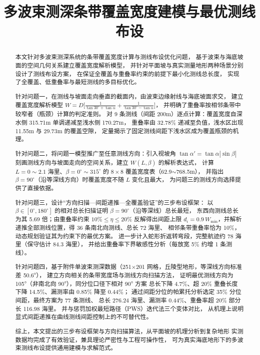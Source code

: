 \documentclass[withoutpreface,bwprint]{cumcmthesis} %
\title{多波束测深条带覆盖宽度建模与最优测线布设}
\begin{document}
\maketitle
\begin{abstract}
本文针对多波束测深系统的条带覆盖宽度计算与测线布设优化问题，
基于波束与海底坡面的空间几何关系建立覆盖宽度解析模型，
并针对平面坡与真实测量地形两种场景分别设计了测线布设方案，
在保证全覆盖与重叠率约束的前提下最小化测线总长度，
实现了全覆盖、低重叠率与最短测线的多目标优化。

针对问题一，在测线与坡面走向垂直的截面内，由波束边缘射线与海底坡面求交，
建立覆盖宽度解析模型 $W = D\big[\frac{1}{\tan30^\circ+\tan\alpha}+\frac{1}{\tan30^\circ-\tan\alpha}\big]$，
并明确了重叠率按相邻条带中较窄者（瓶颈）计算的判定准则。
对 9 条测线（间距 200m）逐点计算：覆盖宽度自深水侧 315.71m 单调递减至浅水侧 170.27m，
重叠率由 32.78\% 递减至负值，浅水区出现 11.55m 与 29.73m 的覆盖空隙，
定量揭示了固定测线间距下浅水区成为覆盖瓶颈的机理。

针对问题二，将问题一模型推广至任意测线方向：引入视坡角 $\tan\alpha'=\tan\alpha|\sin\beta|$
刻画测线方向与坡面走向的空间关系，建立 $W(L,\beta)$ 的解析表达式，
计算 $L=0\sim2.1$ 海里、$\beta=0^\circ\sim315^\circ$ 的 $8\times8$ 覆盖宽度表（62.9$\sim$768.5m），
并指出 $\beta=90^\circ$（沿等深线方向）时覆盖宽度不随 $L$ 变化且最大，
为问题三的测线方向选择提供了直接依据。

针对问题三，设计“方向扫描—间距递推—全覆盖验证”的三步布设框架：
以 $\beta\in[0^\circ,180^\circ]$ 的相对总长扫描证明 $\beta=90^\circ$（沿等深线）总长最短，
东西向测线总长为其 5.69 倍；由重叠率约束 $10\%\le\eta\le20\%$ 反解得出间距上限
$d_i=0.9\,W_{\min}$，并解析递推全部测线位置，得 36 条南北向测线、总长 72 海里、
相邻条带重叠率恰为 10\%，动态规划验证其为约束下的最优方案。
进一步计入蛇形折返转弯段，完整航迹约 78 海里（保守估计 84.3 海里），
并给出重叠率下界敏感性分析（每放宽 5\% 约增 1 条测线）。

针对问题四，基于附件单波束测深数据（251$\times$201 网格，丘陵型地形，等深线方向标准差 50.6°），
建立方向相关的条带宽度场与测线方向扫描方法，
证明最优测线方向为 105°（非南北向 90°），同分位口径下相对 90° 方案
总长下降 4.7\%、超 20\% 重叠长度下降 14.5\%、漏测率由 0.85\% 降至 0.44\%；
通过间距分位的帕累托分析选定 35\% 分位间距，最终方案为 77 条测线、
总长 276.24 海里、漏测率 0.44\%、重叠率超 20\% 部分长 116.98 海里。
并与惩罚加权最短路径（PWS）迭代法三个变体对比，
从机理上说明显式间距递推在曲线测线间距控制上的不可替代性。

综上，本文提出的三步布设框架与方向扫描算法，从平面坡的机理分析到复杂地形
实测数据均完成了有效验证，兼具理论严密性与工程可操作性，
可为真实海底地形下的多波束测线布设提供通用建模与求解范式。


\end{abstract}
\end{document}
